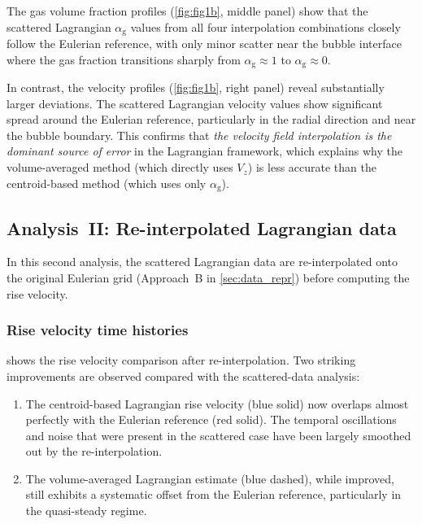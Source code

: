 \documentclass[11pt,a4paper]{article}
\newcommand{\alphag}{\alpha_{\mathrm{g}}}
\newcommand{\Vz}{V_z}
\begin{document}
The gas volume fraction profiles (\cref{fig:fig1b}, middle panel) show that
the scattered Lagrangian $\alphag$ values from all four interpolation
combinations closely follow the Eulerian reference, with only minor scatter
near the bubble interface where the gas fraction transitions sharply from
$\alphag \approx 1$ to $\alphag \approx 0$.

In contrast, the velocity profiles (\cref{fig:fig1b}, right panel) reveal
substantially larger deviations.  The scattered Lagrangian velocity values
show significant spread around the Eulerian reference, particularly in the
radial direction and near the bubble boundary.  This confirms that
\emph{the velocity field interpolation is the dominant source of error} in
the Lagrangian framework, which explains why the volume-averaged method
(which directly uses $\Vz$) is less accurate than the centroid-based method
(which uses only $\alphag$).


\subsection{Analysis~II: Re-interpolated Lagrangian data}
\label{sec:results_interpolated}

In this second analysis, the scattered Lagrangian data are re-interpolated
onto the original Eulerian grid (Approach~B in \cref{sec:data_repr}) before
computing the rise velocity.

\subsubsection{Rise velocity time histories}

 shows the rise velocity comparison after
re-interpolation.  Two striking improvements are observed compared with the
scattered-data analysis:

\begin{enumerate}[label=(\arabic*)]
  \item The centroid-based Lagrangian rise velocity (blue solid) now overlaps
    almost perfectly with the Eulerian reference (red solid).  The temporal
    oscillations and noise that were present in the scattered case have been
    largely smoothed out by the re-interpolation.
  \item The volume-averaged Lagrangian estimate (blue dashed), while
    improved, still exhibits a systematic offset from the Eulerian reference,
    particularly in the quasi-steady regime.
\end{enumerate}
\end{document}
